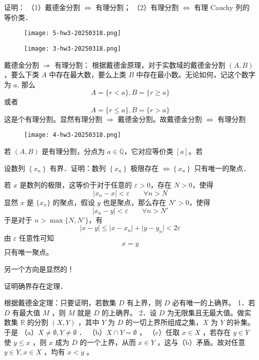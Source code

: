 \begin{exercise}
证明：
（1）戴德金分割 $\Longleftrightarrow$ 有理分割；
（2）有理分割 $\Longleftrightarrow$ 有理 Cauchy 列的等价类．
\end{exercise}
\begin{definition}[戴德金分割]
\begin{figure}[H]
\centering
\texttt{[image: 5-hw3-20250318.png]}
\label{}
\end{figure}
\end{definition}
\begin{definition}[有理分割]
\begin{figure}[H]
\centering
\texttt{[image: 3-hw3-20250318.png]}
\label{}
\end{figure}
\end{definition}
戴德金分割 $\Rightarrow$ 有理分割： 根据戴德金原理，对于实数域的戴德金分割 $(A,B)$，要么下类 $A$ 中存在最大数，要么上类 $B$ 中存在最小数。无论如何，记这个数字为 $a$, 那么
\[
A=\{ r<a \},B=\{ r\geq a \}
\]
或者
\[
A=\{ r\leq a \},B=\{ r> a \}
\]
这是个有理分割。显然有理分割 $\Rightarrow$ 戴德金分割。故戴德金分割 $\Longleftrightarrow$ 有理分割

\begin{figure}[H]
\centering
\texttt{[image: 4-hw3-20250318.png]}
\label{}
\end{figure}

若 $(A,B)$ 是有理分割，分点为 $a\in \mathbb{Q}$，它对应等价类 $[a]$。若

\begin{exercise}
设数列 $\left\{x_n\right\}$ 有界．证明：数列 $\left\{x_n\right\}$ 极限存在 $\Longleftrightarrow\left\{x_n\right\}$ 只有唯一的聚点．
\end{exercise}
若 $x$ 是数列的极限，这等价于对于任意的 $\varepsilon>0$，存在 $N>0$，使得
\[
\lvert x_n-x \rvert <\varepsilon \qquad \forall n>N
\]
显然 $x$ 是 $\{ x_n \}$ 的聚点，假设 $y$ 也是聚点，那么存在 $N'>0$，使得
\[
\lvert x_n-y \rvert <\varepsilon \qquad \forall n>N'
\]
于是对于 $n>\max\{ N,N' \}$，有
\[
\lvert x-y \rvert \leq \lvert x-x_n \rvert +\lvert y-y_n \rvert <2\varepsilon
\]
由 $\varepsilon$ 任意性可知
\[
x=y
\]
只有唯一聚点。

另一个方向是显然的！

\begin{exercise}
证明确界存在定理．
\end{exercise}
根据戴德金定理：只要证明，若数集 $D$ 有上界，则 $D$ 必有唯一的上确界。
1．若 $D$ 有最大值 $M$ ，则 $M$ 就是 $D$ 的上确界。
2．设 $D$ 为无限集且无最大值。做实数集 $\mathbb{R}$ 的分割 $(X, Y)$ ，其中 $Y$ 为 $D$ 的一切上界所组成之集，$X$ 为 $Y$ 的补集。于是
（a）$X \neq \emptyset, Y \neq \emptyset$ ．
（b）$X \cap Y=\emptyset$ ，
（c）任取 $x \in X$ ，若存在 $y \in Y$ 使 $y \leqslant x$ ，则 $x$ 成为 $D$ 的一个上界，从而 $x \in Y$ ，这与（b）矛盾。故对任意 $y \in Y, x \in X$ ，均有 $x<y$ 。

